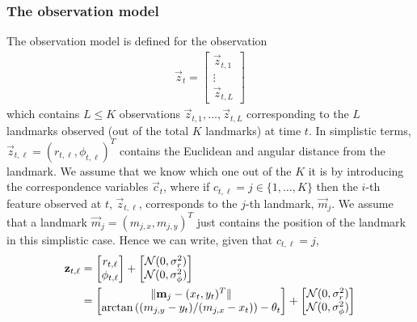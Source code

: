 \subsubsection{The observation model}
\label{subsubsec:models/kf/localisation/obs}
The observation model is defined for the observation
\begin{align}
	\vec z_t = 
		\begin{bmatrix}
			\vec z_{t, 1} \\
			\vdots \\
			\vec z_{t, L}
		\end{bmatrix} \label{eqn:models/kf/localisation/obs}
\end{align}
which contains $L \leq K$ observations $\vec z_{t, 1}, \dotsc, \vec z_{t, L}$ corresponding to the $L$ landmarks observed (out of the total $K$ landmarks) at time $t$. In simplistic terms, $\vec z_{t, \ell} = (r_{t, \ell}, \phi_{t, \ell})^T$ contains the Euclidean and angular distance from the landmark. We assume that we know which one out of the $K$ it is by introducing the correspondence variables $\vec c_t$, where if $c_{t, \ell} = j \in \{1, \dotsc, K\}$ then the $i$-th feature observed at $t$, $\vec z_{t, \ell}$, corresponds to the $j$-th landmark, $\vec m_j$. We assume that a landmark $\vec m_j = (m_{j, x}, m_{j, y})^T$ just contains the position of the landmark in this simplistic case. Hence we can write, given that $c_{t, \ell} = j$,
\begin{align}
	\boldsymbol{\mathbf{z}}_{t, \ell} &= 
						\begin{bmatrix}
							r_{t, \ell} \\
							\phi_{t, \ell}
						\end{bmatrix} 
						+
						\begin{bmatrix}
							\operatorname{\mathcal N}(0, \sigma^2_r) \\
							\operatorname{\mathcal N}(0, \sigma^2_\phi)
						\end{bmatrix} \\
					&= 
						\begin{bmatrix}
							\|\boldsymbol{\mathbf{m}}_j - (x_t, y_t)^T\| \\
							\arctan\left((m_{j, y} - y_t) / (m_{j, x} - x_t) \right) - \theta_t
						\end{bmatrix}
						+
						\begin{bmatrix}
							\operatorname{\mathcal N}(0, \sigma^2_r) \\
							\operatorname{\mathcal N}(0, \sigma^2_\phi)
						\end{bmatrix} \label{eqn:models/kf/localisation/obs2}
\end{align}
